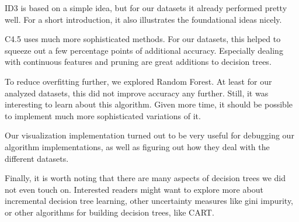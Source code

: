\documentclass[a4paper]{article}
\begin{document}
ID3 is based on a simple idea, but for our datasets it already performed pretty well. For a short introduction, it also illustrates the foundational ideas nicely.

C4.5 uses much more sophisticated methods. For our datasets, this helped to squeeze out a few percentage points of additional accuracy. Especially dealing with continuous features and pruning are great additions to decision trees.

To reduce overfitting further, we explored Random Forest. At least for our analyzed datasets, this did not improve accuracy any further. Still, it was interesting to learn about this algorithm. Given more time, it should be possible to implement much more sophisticated variations of it.

Our visualization implementation turned out to be very useful for debugging our algorithm implementations, as well as figuring out how they deal with the different datasets.

Finally, it is worth noting that there are many aspects of decision trees we did not even touch on.  Interested readers might want to explore more about incremental decision tree learning, other uncertainty measures like gini impurity, or other algorithms for building decision trees, like CART.





\end{document}
